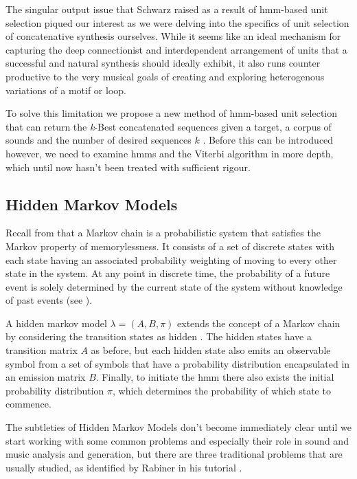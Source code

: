 {{{{{{{The singular output issue that Schwarz raised as a result of \acrshort{hmm}-based unit selection piqued our interest as we were delving into the specifics of unit selection  of concatenative synthesis ourselves. While it seems like an ideal mechanism for capturing the deep connectionist and interdependent arrangement of units that a successful and natural synthesis should ideally exhibit, it also runs counter productive to the very musical goals of creating and exploring heterogenous variations of a motif or loop.

To solve this limitation we propose a new method of \acrshort{hmm}-based unit selection that can return the \textit{k}-Best concatenated sequences given a target, a corpus of sounds and the number of desired sequences $k$ \citep{Nuanain2017}. Before this can be introduced however, we need to examine \acrshort{hmm}s and the Viterbi algorithm in more depth, which until now hasn't been treated with sufficient rigour. 

\subsection{Hidden Markov Models}

Recall from  that a Markov chain is a probabilistic system that satisfies the Markov property of memorylessness. It consists of a set of discrete states with each state having an associated probability weighting of moving to every other state in the system. At any point in discrete time, the probability of a future event is solely determined by the current state of the system without knowledge of past events (see ).

A hidden markov model $\lambda = (A, B, \pi)$ extends the concept of a Markov chain by considering the transition states as hidden \citep{Rabiner1989}. The hidden states have a  transition matrix $A$ as before, but each hidden state also emits an observable symbol from a set of symbols that have a probability distribution encapsulated in an emission matrix $B$. Finally, to initiate the \acrshort{hmm} there also exists the initial probability distribution $\pi$, which determines the probability of which state to commence. 

The subtleties of Hidden Markov Models don’t become immediately clear until we start working with some common problems and especially their role in sound and music analysis and generation, but there are three traditional problems that are usually studied, as identified by Rabiner in his tutorial \citeyearpar{Rabiner1989}.

}}}}}}}
